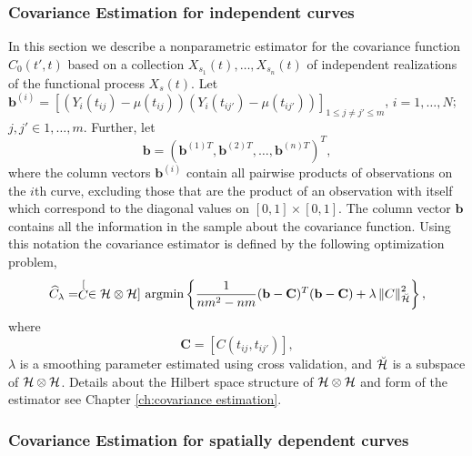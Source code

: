 \subsubsection{Covariance Estimation for independent curves} %
\label{sub:subsection_name}

In this section we describe a nonparametric estimator for the covariance function $C_0(t',t)$ based on a collection $X_{s_1}(t), \dots, X_{s_n}(t)$ of independent realizations of the functional process $X_s(t)$. Let $\mathbf{b}^{(i)} = [(Y_i(t_{ij})-\mu(t_{ij}))(Y_i(t_{ij'})-\mu(t_{ij'}))]_{1\leq j\neq j'\leq m}$, $i=1, \dots, N$; $j,j' \in 1, \dots, m$. Further, let
\begin{equation}
	\mathbf{b} = (\mathbf{b}^{(1)T}, \mathbf{b}^{(2)T}, \dots, \mathbf{b}^{(n)T} )^T, \label{b}
\end{equation} 
where the column vectors $\mathbf{b}^{(i)}$ contain all pairwise products of observations on the $i$th curve, excluding those that are the product of an observation with itself which correspond to the diagonal values on $[0,1]\times [0,1]$. The column vector $\mathbf{b}$ contains all the information in the sample about the covariance function. Using this notation the covariance estimator is defined by the following optimization problem,
\begin{equation}
	 \widehat{C}_{\lambda}=\stackrel[C \in \mathcal{H}\otimes \mathcal{H}]{}{\text{ argmin}} \left\{\frac{1}{nm^2-nm} (\mathbf{b} - \mathbf{C})^T(\mathbf{b} - \mathbf{C})+\lambda\left\Vert C\right\Vert _{\breve{\mathcal{H}}}^{2} \right\},
	 \label{kriging: cov est}
	 \end{equation}
where
\[ \mathbf{C} = [C(t_{ij}, t_{ij'})], \]
 $\lambda$ is a smoothing parameter estimated using cross validation, and $\breve{\mathcal{H}}$ is a subspace of $\mathcal{H}\otimes\mathcal{H}$. Details about the Hilbert space structure of $\mathcal{H}\otimes\mathcal{H}$ and form of the estimator see Chapter \ref{ch:covariance estimation}. 

\subsubsection{Covariance Estimation for spatially dependent curves} %
\label{sub:weighted covariance}


